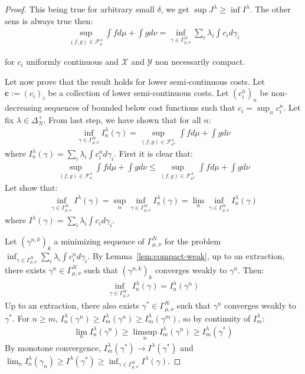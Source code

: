 \begin{proof}
This being true for arbitrary small $\delta$, we get $\sup J^\lambda\geq\inf I^\lambda$. The other sens is always true then:
\begin{align*}
\sup\limits_{(f,g)\in\mathcal{F}^\lambda_\mathbf{c}}\int fd\mu+\int gd\nu = \inf\limits_{\gamma\in\Gamma^N_{\mu,\nu}}\sum_i\lambda_i \int c_id\gamma_i
\end{align*}

for $c_i$ uniformly continuous and $\mathcal{X}$ and $\mathcal{Y}$ non necessarily compact.

\medskip
Let now prove that the result holds for lower semi-continuous costs. Let $\mathbf{c}:=(c_i)_i$ be a collection of lower semi-continuous costs. Let $(c^n_i)_n$ be non-decreasing sequences of bounded below cost functions such that $c_i=\sup_n c^n_i$. Let fix $\lambda\in\Delta^+_N$. From last step, we have shown that for all $n$:
\begin{align}
    \label{eq:eq_on_cont}
    \inf_{\gamma\in \Gamma^N_{\mu,\nu}} I^\lambda_n(\gamma)= \sup\limits_{(f,g)\in\mathcal{F}^\lambda_{\mathbf{c}^n}}\int fd\mu+\int gd\nu
\end{align}
where $I^\lambda_n(\gamma)=\sum_i\lambda_i \int c^n_id\gamma_i$. First it is clear that:
\begin{align}
\label{eq:ineq_sup}
\sup\limits_{(f,g)\in\mathcal{F}^\lambda_\mathbf{c}}\int fd\mu+\int gd\nu\leq \sup\limits_{(f,g)\in\mathcal{F}^{\lambda}_{\mathbf{c}^n}}\int fd\mu+\int gd\nu
\end{align}
Let show that:
\begin{align*}
\inf_{\gamma\in \Gamma^N_{\mu,\nu}} I^\lambda(\gamma)=\sup_n\inf_{\gamma\in \Gamma^N_{\mu,\nu}} I^\lambda_n(\gamma) = \lim_n\inf_{\gamma\in \Gamma^N_{\mu,\nu}} I^\lambda_n(\gamma)
\end{align*}
where $I^\lambda(\gamma) = \sum_i\lambda_i \int c_id\gamma_i$. 

Let $(\gamma^{n,k})_k$ a minimizing sequence of $\Gamma^N_{\mu,\nu}$ for the problem $\inf_{\gamma\in \Gamma^N_{\mu,\nu}} \sum_i\lambda_i \int c^n_id\gamma_i$. By Lemma~\ref{lem:compact-weak}, up to an extraction, there exists  $\gamma^n\in \Gamma^N_{\mu,\nu}$ such that $(\gamma^{n,k})_k$ converges weakly to $\gamma^n$. Then:
\begin{align*}
\inf_{\gamma\in \Gamma^N_{\mu,\nu}} I_n^\lambda(\gamma) =I^\lambda_n(\gamma^n)
\end{align*}
Up to an extraction, there also exists $\gamma^*\in\Gamma^N_{\mu,\nu}$ such that $\gamma^n$ converges weakly to $\gamma^*$. For $n\geq m$, $I^\lambda_n(\gamma^n) \geq I^\lambda_m(\gamma^n)\geq I^\lambda_m(\gamma^m) $, so by continuity of $I^\lambda_m$:
\begin{align*}
\lim_n I^\lambda_n(\gamma^n) \geq\limsup_n I^\lambda_m(\gamma^n)\geq I^\lambda_m(\gamma^*)
\end{align*}
By monotone convergence, $I^\lambda_m(\gamma^*)\rightarrow I^\lambda(\gamma^*)$ and $\lim_nI^\lambda_n(\gamma_n) \geq I^\lambda(\gamma^*)\geq\inf_{\gamma\in\Gamma^N_{\mu,\nu}}I^\lambda(\gamma)$.


\end{proof}
